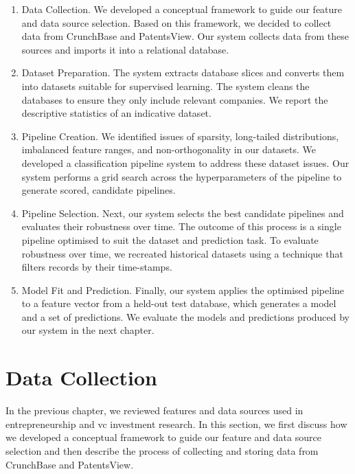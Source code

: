 \documentclass[../thesis/thesis.tex]{subfiles}
\begin{document}
\begin{enumerate}

\item Data Collection. We developed a conceptual framework to guide our feature and data source selection. Based on this framework, we decided to collect data from CrunchBase and PatentsView. Our system collects data from these sources and imports it into a relational database.

\item  Dataset Preparation. The system extracts database slices and converts them into datasets suitable for supervised learning. The system cleans the databases to ensure they only include relevant companies. We report the descriptive statistics of an indicative dataset.

\item Pipeline Creation. We identified issues of sparsity, long-tailed distributions, imbalanced feature ranges, and non-orthogonality in our datasets. We developed a classification pipeline system to address these dataset issues. Our system performs a grid search across the hyperparameters of the pipeline to generate scored, candidate pipelines.

\item Pipeline Selection. Next, our system selects the best candidate pipelines and evaluates their robustness over time. The outcome of this process is a single pipeline optimised to suit the dataset and prediction task. To evaluate robustness over time, we recreated historical datasets using a technique that filters records by their time-stamps.

\item Model Fit and Prediction. Finally, our system applies the optimised pipeline to a feature vector from a held-out test database, which generates a model and a set of predictions. We evaluate the models and predictions produced by our system in the next chapter.

\end{enumerate}

\section{Data Collection}

In the previous chapter, we reviewed features and data sources used in entrepreneurship and \gls{vc} investment research. In this section, we first discuss how we developed a conceptual framework to guide our feature and data source selection and then describe the process of collecting and storing data from CrunchBase and PatentsView.
\end{document}
